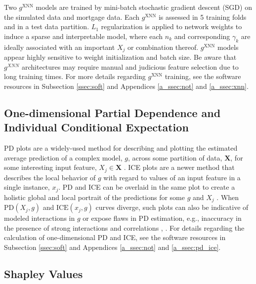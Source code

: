 \documentclass[information,article,submit,moreauthors,pdftex]{definitions/mdpi}
\begin{document}
Two $g^\text{XNN}$ models are trained by mini-batch stochastic gradient descent (SGD) on the simulated data and mortgage data. Each $g^\text{XNN}$ is assessed in 5 training folds and in a test data partition. $L_1$ regularization is applied to network weights to induce a sparse and interpretable model, where each $n_k$ and corresponding $\gamma_k$ are ideally associated with an important $X_j$ or combination thereof. $g^\text{XNN}$ models appear highly sensitive to weight initialization and batch size. Be aware that $g^{XNN}$ architectures may require manual and judicious feature selection due to long training times. For more details regarding $g^\text{XNN}$ training, see the software resources in Subsection \ref{ssec:soft} and Appendices  \ref{a_ssec:not} and \ref{a_ssec:xnn}.

\subsection{One-dimensional Partial Dependence and Individual Conditional Expectation}\label{ssec:pd_ice}

PD plots are a widely-used method for describing and plotting the estimated average prediction of a complex model, $g$, across some partition of data, $\mathbf{X}$, for some interesting input feature, $X_j \in \mathbf{X}$ \cite{esl}. ICE plots are a newer method that describes the local behavior of $g$ with regard to values of an input feature in a single instance, $x_j$. PD and ICE can be overlaid in the same plot to create a holistic global and local portrait of the predictions for some $g$ and $X_j$ \cite{ice_plots}. When $\text{PD}(X_j, g)$ and $\text{ICE}(x_j,  g)$ curves diverge, such plots can also be indicative of modeled interactions in $g$ or expose flaws in PD estimation, e.g., inaccuracy in the presence of strong interactions and correlations \cite{ice_plots}, \cite{ale_plot}.  For details regarding the calculation of one-dimensional PD and ICE, see the software resources in Subsection \ref{ssec:soft} and Appendices \ref{a_ssec:not} and \ref{a_ssec:pd_ice}.

\subsection{Shapley Values}\label{ssec:shap}
\end{document}
